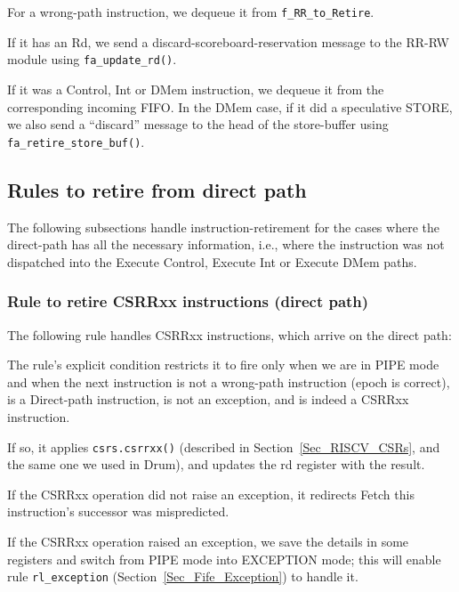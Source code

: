 For a wrong-path instruction, we dequeue it from \verb|f_RR_to_Retire|.

If it has an Rd, we send a discard-scoreboard-reservation message to
the RR-RW module using \verb|fa_update_rd()|.

If it was a Control, Int or DMem instruction, we dequeue it from the
corresponding incoming FIFO.  In the DMem case, if it did a
speculative STORE, we also send a ``discard'' message to the head of
the store-buffer using \verb|fa_retire_store_buf()|.



\subsection{Rules to retire from direct path}

The following subsections handle instruction-retirement for the cases
where the direct-path has all the necessary information, i.e., where
the instruction was not dispatched into the Execute Control, Execute
Int or Execute DMem paths.


\subsubsection{Rule to retire CSRRxx instructions (direct path)}

\label{Sec_Fife_Retire_CSRRxx}

The following rule handles CSRRxx instructions, which arrive on the direct path:


The rule's explicit condition restricts it to fire only when we are in
PIPE mode and when the next instruction is not a wrong-path
instruction (epoch is correct), is a Direct-path instruction, is not
an exception, and is indeed a CSRRxx instruction.

If so, it applies \verb|csrs.csrrxx()| (described in
Section~\ref{Sec_RISCV_CSRs}, and the same one we used in Drum), and
updates the rd register with the result.

If the CSRRxx operation did not raise an exception, it redirects Fetch
this instruction's successor was mispredicted.

If the CSRRxx operation raised an exception, we save the details in
some registers and switch from PIPE mode into EXCEPTION mode; this
will enable rule \verb|rl_exception|
(Section~\ref{Sec_Fife_Exception}) to handle it.

